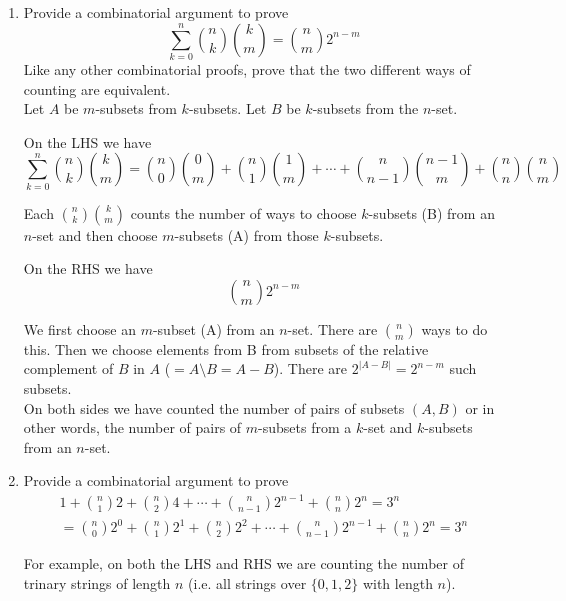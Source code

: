 \documentclass[10pt,a4paper,final]{article}
\begin{document}
\begin{enumerate}
\item %
Provide a combinatorial argument to prove
\begin{equation*}
\sum_{k=0}^n \binom{n}{k} \binom{k}{m} = \binom{n}{m} 2^{n-m} %
\end{equation*}
Like any other combinatorial proofs, prove that the two different ways of counting are equivalent.\\

Let $A$ be $m$-subsets from $k$-subsets.
Let $B$ be $k$-subsets from the $n$-set.

On the LHS we have
\begin{equation*}
\sum_{k=0}^n \binom{n}{k} \binom{k}{m} = \binom{n}{0}\binom{0}{m} + \binom{n}{1}\binom{1}{m} +
\cdots + \binom{n}{n-1}\binom{n-1}{m} + \binom{n}{n}\binom{n}{m}
\end{equation*}

Each $\binom{n}{k} \binom{k}{m}$ counts the number of ways to choose $k$-subsets (B) from an $n$-set
and then choose $m$-subsets (A) from those $k$-subsets.

On the RHS we have
\begin{equation*}
\binom{n}{m} 2^{n-m}
\end{equation*}

We first choose an $m$-subset (A) from an $n$-set. There are $n \choose m$ ways to do this.
Then we choose elements from B from subsets of the relative complement of $B$ in $A$
($= A \setminus B = A - B$). There are $2^{|A-B|} = 2^{n-m}$ such subsets.\\

On both sides we have counted the number of pairs of subsets $(A,B)$ or in other words,
the number of pairs of $m$-subsets from a $k$-set and $k$-subsets from an $n$-set.

\item %
Provide a combinatorial argument to prove
\begin{eqnarray*}
1 + \binom{n}{1}2 + \binom{n}{2}4 + \cdots + \binom{n}{n-1}2^{n-1} + \binom{n}{n}2^n = 3^n\\
=\binom{n}{0}2^0 + \binom{n}{1}2^1 + \binom{n}{2}2^2 + \cdots + \binom{n}{n-1}2^{n-1} + \binom{n}{n}2^n
= 3^n
\end{eqnarray*}

For example, on both the LHS and RHS we are counting the number of trinary strings of length $n$
(i.e. all strings over $\{0,1,2\}$ with length $n$).\\


\end{enumerate}
\end{document}
